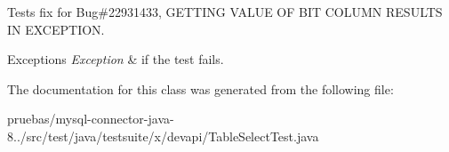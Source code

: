 Tests fix for Bug\#22931433, G\+E\+T\+T\+I\+NG V\+A\+L\+UE OF B\+IT C\+O\+L\+U\+MN R\+E\+S\+U\+L\+TS IN E\+X\+C\+E\+P\+T\+I\+ON.


\begin{DoxyExceptions}{Exceptions}
{\em Exception} & if the test fails. \\
\hline
\end{DoxyExceptions}


The documentation for this class was generated from the following file\+:\begin{DoxyCompactItemize}
\item 
pruebas/mysql-\/connector-\/java-\/8../src/test/java/testsuite/x/devapi/Table\+Select\+Test.\+java\end{DoxyCompactItemize}
